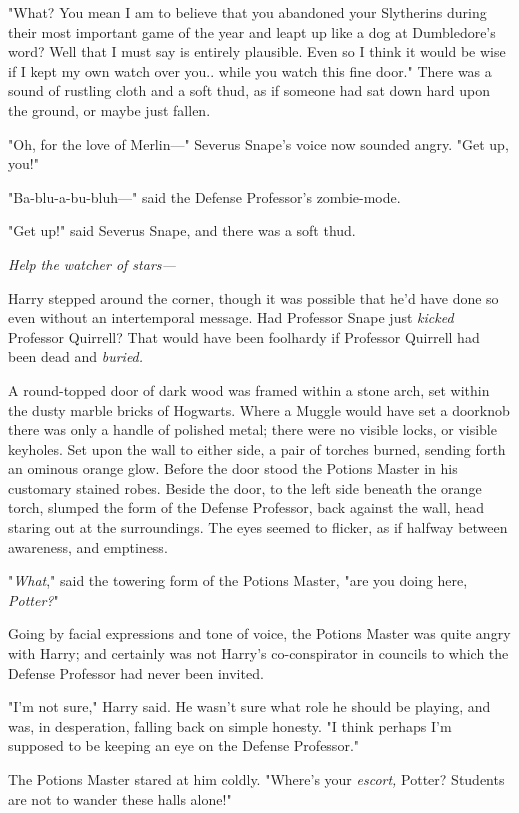 "What? You mean I am to believe{\el} that you abandoned your
Slytherins{\el} during their most important{\el} game of the year{\el}
and leapt up like a dog{\el} at Dumbledore's word? Well that{\el} I must
say{\el} is entirely plausible. Even so{\el} I think it would be
wise{\el} if I kept my own watch over you.. while you watch this fine door."
There was a sound of rustling cloth and a soft thud, as if someone had sat down
hard upon the ground, or maybe just fallen.

"Oh, for the love of Merlin—" Severus Snape's voice now sounded angry. "Get
up, you!"

"Ba-blu-a-bu-bluh—" said the Defense Professor's zombie-mode.

"Get up!" said Severus Snape, and there was a soft thud.

\emph{Help the watcher of stars—}

Harry stepped around the corner, though it was possible that he'd have done so
even without an intertemporal message. Had Professor Snape just \emph{kicked}
Professor Quirrell? That would have been foolhardy if Professor Quirrell had
been dead and \emph{buried.}

A round-topped door of dark wood was framed within a stone arch, set within the
dusty marble bricks of Hogwarts. Where a Muggle would have set a doorknob there
was only a handle of polished metal; there were no visible locks, or visible
keyholes. Set upon the wall to either side, a pair of torches burned, sending
forth an ominous orange glow. Before the door stood the Potions Master in his
customary stained robes. Beside the door, to the left side beneath the orange
torch, slumped the form of the Defense Professor, back against the wall, head
staring out at the surroundings. The eyes seemed to flicker, as if halfway
between awareness, and emptiness.

"\emph{What}," said the towering form of the Potions Master, "are you doing
here, \emph{Potter?}"

Going by facial expressions and tone of voice, the Potions Master was quite
angry with Harry; and certainly was not Harry's co-conspirator in councils to
which the Defense Professor had never been invited.

"I'm not sure," Harry said. He wasn't sure what role he should be playing, and
was, in desperation, falling back on simple honesty. "I think perhaps I'm
supposed to be keeping an eye on the Defense Professor."

The Potions Master stared at him coldly. "Where's your \emph{escort,} Potter?
Students are not to wander these halls alone!"


